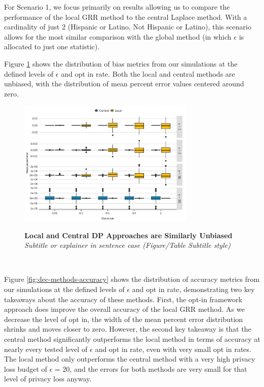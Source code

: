 \documentclass[
]{urban-formatting}
\begin{document}
For Scenario 1, we focus primarily on results allowing us to compare the
performance of the local GRR method to the central Laplace method. With
a cardinality of just 2 (Hispanic or Latino, Not Hispanic or Latino),
this scenario allows for the most similar comparison with the global
method (in which \(\epsilon\) is allocated to just one statistic).

Figure \ref{fig:dec-methods-bias} shows the distribution of bias metrics
from our simulations at the defined levels of \(\epsilon\) and opt in
rate. Both the local and central methods are unbiased, with the
distribution of mean percent error values centered around zero.

\begin{figure}[htbp]
    \caption{
    \textbf{Local and Central DP Approaches are Similarly Unbiased}\\
    \textit{Subtitle or explainer in sentence case (Figure/Table Subtitle style)}
    }
    \centering
    \includegraphics[width=0.75\textwidth]{../analysis/figures/dec-methods-bias.png}
    \label{fig:dec-methods-bias}
\end{figure}
\begin{singlespace}
    \\
\end{singlespace}

Figure \ref{fig:dec-methods-accuracy} shows the distribution of accuracy
metrics from our simulations at the defined levels of \(\epsilon\) and
opt in rate, demonstrating two key takeaways about the accuracy of these
methods. First, the opt-in framework approach does improve the overall
accuracy of the local GRR method. As we decrease the level of opt in,
the width of the mean percent error distribution shrinks and moves
closer to zero. However, the second key takeaway is that the central
method significantly outperforms the local method in terms of accuracy
at nearly every tested level of \(\epsilon\) and opt in rate, even with
very small opt in rates. The local method only outperforms the central
method with a very high privacy loss budget of \(\epsilon\) = 20, and
the errors for both methods are very small for that level of privacy
loss anyway.
\end{document}
